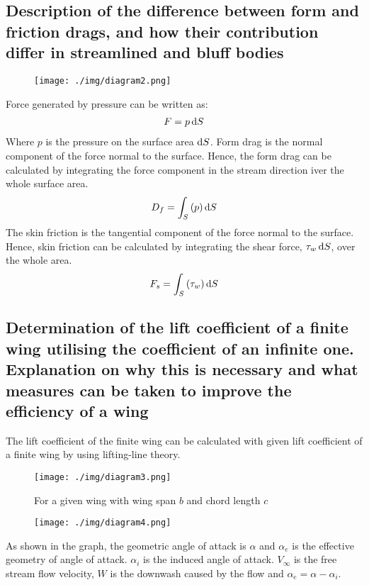 \subsection{Description of the difference between form and friction drags, and how their contribution differ in streamlined and bluff bodies}
\begin{figure}[H]
    \centering
    \texttt{[image: ./img/diagram2.png]}
    \caption{}
\end{figure}
Force generated by pressure can be written as:
\begin{align}
    F = p \dif S
\end{align}
Where $p$ is the pressure on the surface area $\dif S$. Form drag is the normal component of the force normal to the surface. Hence, the form drag can be calculated by integrating the force component in the stream direction iver the whole surface area.
\begin{align}
    D_f = \int_S \left(p\right)\dif S
\end{align}
The skin friction is the tangential component of the force normal to the surface. Hence, skin friction can be calculated by integrating the shear force, $\tau_w \dif S$, over the whole area.
\begin{align}
    F_s = \int_S \left(\tau_w\right)\dif S
\end{align}
\subsection{Determination of the lift coefficient of a finite wing utilising the coefficient of an infinite one. Explanation on why this is necessary and what measures can be taken to improve the efficiency of a wing}
The lift coefficient of the finite wing can be calculated with given lift coefficient of a finite wing by using lifting-line theory.
\begin{figure}[H]
    \centering
    \texttt{[image: ./img/diagram3.png]}
    \caption{For a given wing with wing span $b$ and chord length $c$}
\end{figure}
\begin{figure}[H]
    \centering
    \texttt{[image: ./img/diagram4.png]}
    \caption{}
    \label{GeometricAngleOfAttack}
\end{figure}
As shown in the graph, the geometric angle of attack is $\alpha$ and $\alpha_e$ is the effective geometry of angle of attack. $\alpha_i$ is the induced angle of attack. $V_{\infty}$ is the free stream flow velocity, $W$ is the downwash caused by the flow and $\alpha_e = \alpha - \alpha_i$.

